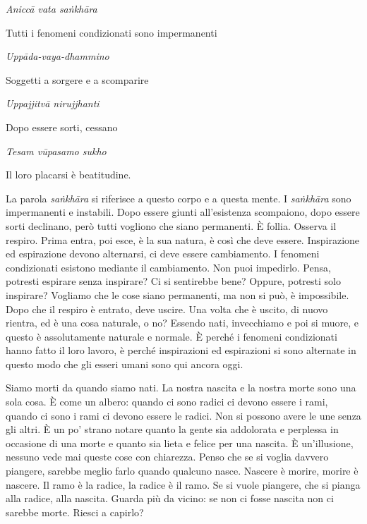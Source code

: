 \emph{Aniccā vata saṅkhāra}

Tutti i fenomeni condizionati sono impermanenti

\emph{Uppāda-vaya-dhammino}

Soggetti a sorgere e a scomparire

\emph{Uppajjitvā nirujjhanti}

Dopo essere sorti, cessano

\emph{Tesam vūpasamo sukho}

Il loro placarsi è beatitudine.

La parola \emph{saṅkhāra} si riferisce a questo corpo e a questa mente.
I \emph{saṅkhāra} sono impermanenti e instabili. Dopo essere giunti
all'esistenza scompaiono, dopo essere sorti declinano, però tutti
vogliono che siano permanenti. È follia. Osserva il respiro. Prima
entra, poi esce, è la sua natura, è così che deve essere. Inspirazione
ed espirazione devono alternarsi, ci deve essere cambiamento. I fenomeni
condizionati esistono mediante il cambiamento. Non puoi impedirlo.
Pensa, potresti espirare senza inspirare? Ci si sentirebbe bene? Oppure,
potresti solo inspirare? Vogliamo che le cose siano permanenti, ma non
si può, è impossibile. Dopo che il respiro è entrato, deve uscire. Una
volta che è uscito, di nuovo rientra, ed è una cosa naturale, o no?
Essendo nati, invecchiamo e poi si muore, e questo è assolutamente
naturale e normale. È perché i fenomeni condizionati hanno fatto il loro
lavoro, è perché inspirazioni ed espirazioni si sono alternate in questo
modo che gli esseri umani sono qui ancora oggi.

Siamo morti da quando siamo nati. La nostra nascita e la nostra morte
sono una sola cosa. È come un albero: quando ci sono radici ci devono
essere i rami, quando ci sono i rami ci devono essere le radici. Non si
possono avere le une senza gli altri. È un po' strano notare quanto la
gente sia addolorata e perplessa in occasione di una morte e quanto sia
lieta e felice per una nascita. È un'illusione, nessuno vede mai queste
cose con chiarezza. Penso che se si voglia davvero piangere, sarebbe
meglio farlo quando qualcuno nasce. Nascere è morire, morire è nascere.
Il ramo è la radice, la radice è il ramo. Se si vuole piangere, che si
pianga alla radice, alla nascita. Guarda più da vicino: se non ci fosse
nascita non ci sarebbe morte. Riesci a capirlo?

